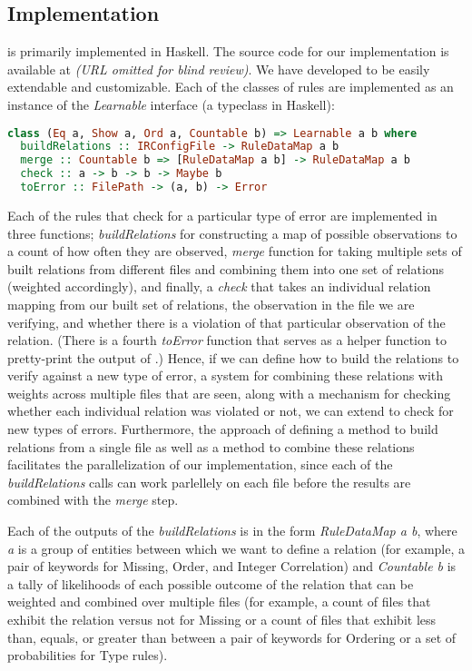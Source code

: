 \iffalse
\subsection{Implementation}

\app is primarily implemented in Haskell.
The source code for our implementation is available at {\em (URL omitted for blind review)}.
We have developed \app to be easily extendable and customizable. Each of the classes of rules are implemented as an instance of the \textit{Learnable} interface (a typeclass in Haskell):

\begin{lstlisting}[language=Haskell, xleftmargin=.01\textwidth]
class (Eq a, Show a, Ord a, Countable b) => Learnable a b where
  buildRelations :: IRConfigFile -> RuleDataMap a b
  merge :: Countable b => [RuleDataMap a b] -> RuleDataMap a b
  check :: a -> b -> b -> Maybe b
  toError :: FilePath -> (a, b) -> Error
\end{lstlisting} 

Each of the rules that check for a particular type of error are implemented in three functions;
   \textit{buildRelations} for constructing a map of possible observations to a count of how often they are observed, 
   \textit{merge} function for taking multiple sets of built relations from different files and combining them into one set of relations (weighted accordingly), 
   and finally, a \textit{check} that takes an individual relation mapping from our built set of relations, the observation in the file we are verifying, and whether there is a violation of that particular observation of the relation. 
(There is a fourth \textit{toError} function that serves as a helper function to pretty-print the output of \app.) 
Hence, if we can define how to build the relations to verify against a new type of error, a system for combining these relations with weights across multiple files that are seen, along with a mechanism for checking whether each individual relation was violated or not, we can extend \app to check for new types of errors. Furthermore, the approach of defining a method to build relations from a single file as well as a method to combine these relations facilitates the parallelization of our implementation, since each of the \textit{buildRelations} calls can work parlellely on each file before the results are combined with the \textit{merge} step.

Each of the outputs of the \textit{buildRelations} is in the form \textit{RuleDataMap a b}, where \textit{a} is a group of entities between which we want to define a relation (for example, a pair of keywords for Missing, Order, and Integer Correlation) and \textit{Countable b} is a tally of likelihoods of each possible outcome of the relation that can be weighted and combined over multiple files (for example, a count of files that exhibit the relation versus not for Missing or a count of files that exhibit less than, equals, or greater than between a pair of keywords for Ordering or a set of probabilities for Type rules).

